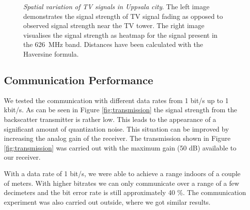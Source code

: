 \begin{figure}[h]
\begin{minipage}{0.49\columnwidth}
	\end{minipage}
	\vspace{-6mm}
	\caption{\emph{Spatial variation of TV signals in Uppsala city}. 
	The left image demonstrates the signal strength of TV signal fading	
	as opposed to observed signal strength near the TV tower. 
	The right image visualises the signal strength as heatmap for the signal
	present in the \SI{626}{\mega\hertz} band. Distances have been
calculated with the Haversine formula. }
 	\vspace{-6mm}

\label{fig:haversine}
\end{figure}

\balance

\subsection{Communication Performance}
We tested the communication with different data rates from 1 bit/s up to
1 kbit/s. As can be seen in Figure \ref{fig:transmission} the signal
strength from the backscatter transmitter is rather low. This leads to the appearance of a
significant amount of quantization noise. This situation can
be improved by increasing the analog gain of the receiver. The
transmission shown in Figure \ref{fig:transmission} was carried out with
the maximum gain (50 dB) available to our receiver. 

With a data rate of 1 bit/s, we were able to achieve a range indoors
of a couple of meters. With higher bitrates we
can only communicate over a range of a few decimeters and the 
bit error rate is still approximately 40 \%. The communication
experiment was also carried out outside, where we got similar results.  
